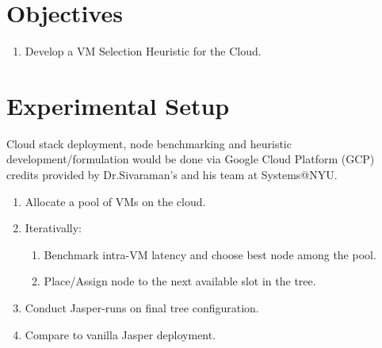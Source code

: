 \documentclass{article}
\begin{document}
\section{Objectives}
\begin{enumerate}
    \item Develop a VM Selection Heuristic for the Cloud.
\end{enumerate}

\section{Experimental Setup}
Cloud stack deployment, node benchmarking and heuristic development/formulation would be done 
via Google Cloud Platform (GCP) credits provided by Dr.Sivaraman's and his team at Systems@NYU.

\begin{enumerate}
    \item Allocate a pool of VMs on the cloud.
    \item Iterativally:
    \begin{enumerate}
        \item Benchmark intra-VM latency and choose best node among the pool.
        \item Place/Assign node to the next available slot in the tree.
    \end{enumerate}
    \item Conduct Jasper-runs on final tree configuration.
    \item Compare to vanilla Jasper deployment.
\end{enumerate}


    

 
    
\end{document}
